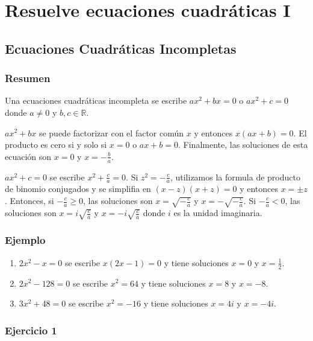 \chapter{Resuelve ecuaciones cuadráticas I}

\section{Ecuaciones Cuadráticas Incompletas}

\subsection*{Resumen}

Una ecuaciones cuadráticas incompleta se escribe
$a x^2 + b x = 0$ o $a x^2 + c = 0$ donde $a \neq 0$ y $b, c \in \mathbb{R}$.

$a x^2 + b x$ se puede factorizar con el factor común $x$ y entonces
$x \left(ax + b \right) = 0$. El producto es cero si y solo si
$x = 0$ o $ax + b = 0$. Finalmente, las soluciones de esta ecuación son
$x = 0$ y $x = -\frac{b}{a}$.

$a x^2 + c = 0$ se escribe $x^2 + \frac{c}{a} = 0$. Si $z^2 = -\frac{c}{a}$,
utilizamos la formula de producto de binomio conjugados y
se simplifia en ${(x - z)}{(x + z)} = 0$ y entonces $x = \pm z$.
Entonces, si $-\frac{c}{a} \geq 0$, las soluciones son
$x = \sqrt{-\frac{c}{a}}$ y $x = -\sqrt{-\frac{c}{a}}$. Si $-\frac{c}{a} < 0$,
las soluciones son $x = i \sqrt{\frac{c}{a}}$ y $x = -i \sqrt{\frac{c}{a}}$
donde $i$ es la unidad imaginaria.

\subsection*{Ejemplo}

\begin{enumerate}
\item $2x^2 - x = 0$ se escribe $x{(2x - 1)} = 0$ y tiene soluciones
  $x = 0$ y $x = \frac{1}{2}$.
\item $2x^2 - 128 = 0$ se escribe $x^2  = 64$ y tiene soluciones
  $x = 8$ y $x = -8$.
\item $3x^2 + 48 = 0$ se escribe $x^2  = -16$ y tiene soluciones
  $x = 4i$ y $x = -4i$.
\end{enumerate}

\subsection*{Ejercicio 1}

